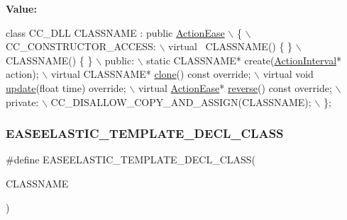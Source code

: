 {\bfseries Value\+:}
\begin{DoxyCode}
\textcolor{keyword}{class }CC\_DLL CLASSNAME : \textcolor{keyword}{public} \hyperlink{classActionEase}{ActionEase} \(\backslash\)
\{ \(\backslash\)
CC\_CONSTRUCTOR\_ACCESS: \(\backslash\)
    virtual ~CLASSNAME() \{ \} \(\backslash\)
    CLASSNAME() \{ \} \(\backslash\)
public: \(\backslash\)
    static CLASSNAME* create(\hyperlink{classActionInterval}{ActionInterval}* action); \(\backslash\)
    virtual CLASSNAME* \hyperlink{classActionEase_a39bec93fe161fb732a74d8e51a2fe08b}{clone}() \textcolor{keyword}{const override}; \(\backslash\)
    virtual \textcolor{keywordtype}{void} \hyperlink{classActionEase_a77679f09c02cf75fb54776470c339fc5}{update}(\textcolor{keywordtype}{float} time) \textcolor{keyword}{override}; \(\backslash\)
    virtual \hyperlink{classActionEase}{ActionEase}* \hyperlink{classActionEase_ab99eb083fa033fae1d6c948fdc730782}{reverse}() \textcolor{keyword}{const override}; \(\backslash\)
private: \(\backslash\)
    CC\_DISALLOW\_COPY\_AND\_ASSIGN(CLASSNAME); \(\backslash\)
\};
\end{DoxyCode}
\mbox{\label{group__actions_gabad2ae9d104364c6a2270949bef1e197}} 
\subsubsection{\texorpdfstring{E\+A\+S\+E\+E\+L\+A\+S\+T\+I\+C\+\_\+\+T\+E\+M\+P\+L\+A\+T\+E\+\_\+\+D\+E\+C\+L\+\_\+\+C\+L\+A\+SS}{EASEELASTIC\_TEMPLATE\_DECL\_CLASS}}
{\footnotesize\ttfamily \#define E\+A\+S\+E\+E\+L\+A\+S\+T\+I\+C\+\_\+\+T\+E\+M\+P\+L\+A\+T\+E\+\_\+\+D\+E\+C\+L\+\_\+\+C\+L\+A\+SS(\begin{DoxyParamCaption}\item[{}]{C\+L\+A\+S\+S\+N\+A\+ME }\end{DoxyParamCaption})}

